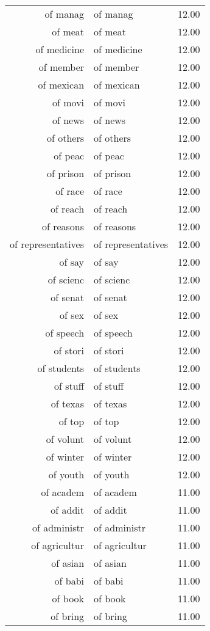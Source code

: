 \begin{table}[ht]
\begin{tabular}{rlr}
  of manag & of manag & 12.00 \\ 
  of meat & of meat & 12.00 \\ 
  of medicine & of medicine & 12.00 \\ 
  of member & of member & 12.00 \\ 
  of mexican & of mexican & 12.00 \\ 
  of movi & of movi & 12.00 \\ 
  of news & of news & 12.00 \\ 
  of others & of others & 12.00 \\ 
  of peac & of peac & 12.00 \\ 
  of prison & of prison & 12.00 \\ 
  of race & of race & 12.00 \\ 
  of reach & of reach & 12.00 \\ 
  of reasons & of reasons & 12.00 \\ 
  of representatives & of representatives & 12.00 \\ 
  of say & of say & 12.00 \\ 
  of scienc & of scienc & 12.00 \\ 
  of senat & of senat & 12.00 \\ 
  of sex & of sex & 12.00 \\ 
  of speech & of speech & 12.00 \\ 
  of stori & of stori & 12.00 \\ 
  of students & of students & 12.00 \\ 
  of stuff & of stuff & 12.00 \\ 
  of texas & of texas & 12.00 \\ 
  of top & of top & 12.00 \\ 
  of volunt & of volunt & 12.00 \\ 
  of winter & of winter & 12.00 \\ 
  of youth & of youth & 12.00 \\ 
  of academ & of academ & 11.00 \\ 
  of addit & of addit & 11.00 \\ 
  of administr & of administr & 11.00 \\ 
  of agricultur & of agricultur & 11.00 \\ 
  of asian & of asian & 11.00 \\ 
  of babi & of babi & 11.00 \\ 
  of book & of book & 11.00 \\ 
  of bring & of bring & 11.00 \\ 

\end{tabular}
\end{table}
